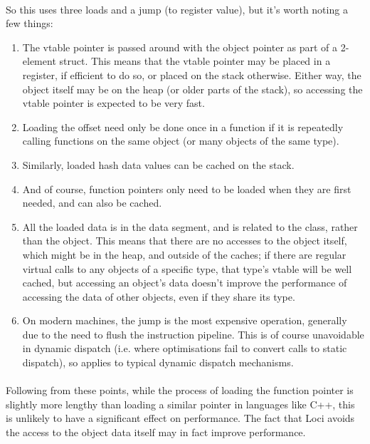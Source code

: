 \documentclass[12pt,twoside,notitlepage]{report}
\begin{document}
\paragraph{}
So this uses three loads and a jump (to register value), but it's worth noting a few things:

\begin{enumerate}
\item The vtable pointer is passed around with the object pointer as part of a 2-element struct. This means that the vtable pointer may be placed in a register, if efficient to do so, or placed on the stack otherwise. Either way, the object itself may be on the heap (or older parts of the stack), so accessing the vtable pointer is expected to be very fast.
\item Loading the offset need only be done once in a function if it is repeatedly calling functions on the same object (or many objects of the same type).
\item Similarly, loaded hash data values can be cached on the stack.
\item And of course, function pointers only need to be loaded when they are first needed, and can also be cached.
\item All the loaded data is in the data segment, and is related to the class, rather than the object. This means that there are no accesses to the object itself, which might be in the heap, and outside of the caches; if there are regular virtual calls to any objects of a specific type, that type's vtable will be well cached, but accessing an object's data doesn't improve the performance of accessing the data of other objects, even if they share its type.
\item On modern machines, the jump is the most expensive operation, generally due to the need to flush the instruction pipeline. This is of course unavoidable in dynamic dispatch (i.e. where optimisations fail to convert calls to static dispatch), so applies to typical dynamic dispatch mechanisms.
\end{enumerate}

\paragraph{}
Following from these points, while the process of loading the function pointer is slightly more lengthy than loading a similar pointer in languages like C++, this is unlikely to have a significant effect on performance. The fact that Loci avoids the access to the object data itself may in fact improve performance.
\end{document}
